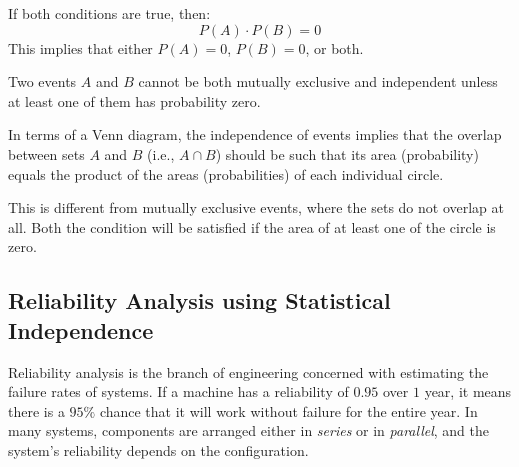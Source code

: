 \documentclass[twoside]{book}
\begin{document}
If both conditions are true, then:
\[
P(A) \cdot P(B) = 0
\]
This implies that either \( P(A) = 0 \), \( P(B) = 0 \), or both.

\begin{textbox}
Two events \( A \) and \( B \) cannot be both mutually exclusive and independent unless at least one of them has probability zero.
\end{textbox}


In terms of a Venn diagram, the independence of events implies that the overlap between sets \( A \) and \( B \) (i.e., \( A \cap B \)) should be such that its area (probability) equals the product of the areas (probabilities) of each individual circle.

\begin{center}
\end{center}

This is different from mutually exclusive events, where the sets do not overlap at all. Both the condition will be satisfied if the area of at least one of the circle is zero.

\subsection{Reliability Analysis using Statistical Independence}

Reliability analysis is the branch of engineering concerned with estimating the failure
rates of systems. If a machine has a reliability of $0.95$ over $1$ year, it means there is a $95\%$ chance that it will work without failure for the entire year. In many systems, components are arranged either in \textit{series} or in \textit{parallel}, and the system's reliability depends on the configuration.
\end{document}
